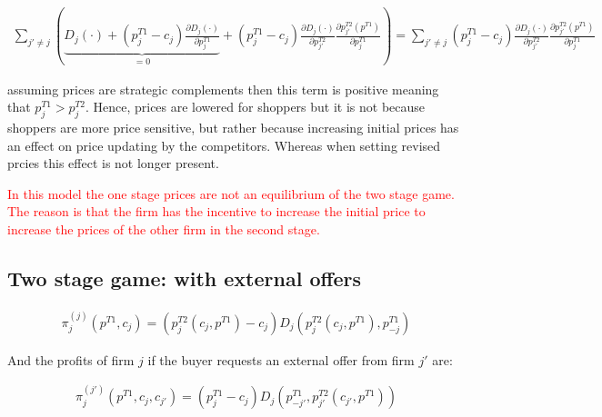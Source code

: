 \documentclass[12pt]{article}
\begin{document}
\begin{align}\label{eq:11}
    \sum_{j'\neq j} \left(
    \underbrace{D_j(\cdot) + (p_j^{T1} - c_j)\frac{\partial D_j(\cdot)}{\partial p_j^{T1}}}_{=0} +
    (p_j^{T1} - c_j) \frac{\partial D_j(\cdot)}{\partial p_{j'}^{T2}} \frac{\partial p_{j'}^{T2}(p^{T1})}{\partial p_j^{T1}}\right)  
    = 
    \sum_{j'\neq j} (p_j^{T1} - c_j) \frac{\partial D_j(\cdot)}{\partial p_{j'}^{T2}} \frac{\partial p_{j'}^{T2}(p^{T1})}{\partial p_j^{T1}}  
\end{align}

assuming prices are strategic complements then this term is positive meaning that $p_j^{T1} >   p_j^{T2}$.
Hence, prices are lowered for shoppers but it is not because shoppers are more price sensitive, but rather because increasing initial prices has an effect on price updating by the competitors. Whereas when setting revised prcies this effect is not longer present. 




\vspace{3cm}
 





\textcolor{red}{In this model the one stage prices are not an equilibrium of the two stage game. The reason is that the firm has the incentive to increase the initial price to increase the prices of the other firm in the second stage. }
 
 





\vspace{3cm}



\newpage 

\subsection{Two stage game:  with external offers}


\begin{align}\label{eq:asking_j} %
    \pi_j^{(j)}(p^{T1}, c_j) =   (p_j^{T2}(c_j, p^{T1}) - c_j) D_j(p_j^{T2}(c_j, p^{T1}), p_{-j}^{T1}) 
\end{align}

And the profits of firm $j$ if the buyer requests an external offer from firm $j'$ are: 

\begin{align}\label{eq:asking_j'} %
    \pi_j^{(j')}(p^{T1}, c_j, c_{j'}) = (p_j^{T1} - c_j) D_j(p_{-j'}^{T1}, p_{ j'}^{T2}(c_{j'}, p^{T1})) 
\end{align}
\end{document}
